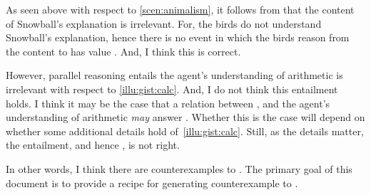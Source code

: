 \begin{note}
  As seen above with respect to \autoref{scen:animalism}, it follows from \issueInclusion{} that the content of Snowball's explanation is irrelevant.
  For, the birds do not understand Snowball's explanation, hence there is no event in which the birds reason from the content to  has value .
  And, I think this is correct.

  However, parallel reasoning entails the agent's understanding of arithmetic is irrelevant with respect to \autoref{illu:gist:calc}.
  And, I do not think this entailment holds.
  I think it may be the case that a relation between \propM{\gistCalcEq{}},  and the agent's understanding of arithmetic \emph{may} answer \qWhy{}.
  Whether this is the case will depend on whether some additional details hold of~\autoref{illu:gist:calc}.
  Still, as the details matter, the entailment, and hence \issueInclusion{}, is not right.
\end{note}

\begin{note}
  In other words, I think there are counterexamples to \issueInclusion{}.
  The primary goal of this document is to provide a recipe for generating counterexample to \issueInclusion{}.
\end{note}

